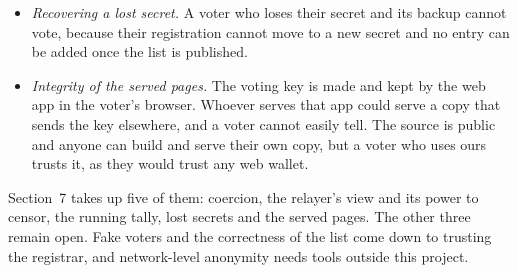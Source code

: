 \begin{itemize}
        influence people who have not voted yet. The timestamps also help
        anyone who knows when a particular person voted to narrow down their
        ballot.
  \item \emph{Recovering a lost secret.} A voter who loses their secret and
        its backup cannot vote, because their registration cannot move to a
        new secret and no entry can be added once the list is published.
  \item \emph{Integrity of the served pages.} The voting key is made and kept
        by the web app in the voter's browser. Whoever serves that app could
        serve a copy that sends the key elsewhere, and a voter cannot easily
        tell. The source is public and anyone can build and serve their own
        copy, but a voter who uses ours trusts it, as they would trust any
        web wallet.
\end{itemize}

Section~7 takes up five of them: coercion, the relayer's view and its power
to censor, the running tally, lost secrets and the served pages. The other
three remain open. Fake voters and the correctness of the list come down to
trusting the registrar, and network-level anonymity needs tools outside this
project.
